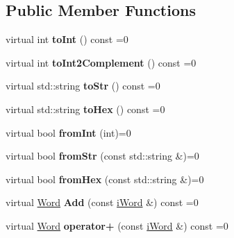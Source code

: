 \subsection*{Public Member Functions}
\begin{DoxyCompactItemize}
\item 
\hypertarget{classiWord_a3349d0a243d3432bb35b76af8420b1d9}{
virtual int {\bfseries toInt} () const =0}
\label{classiWord_a3349d0a243d3432bb35b76af8420b1d9}

\item 
\hypertarget{classiWord_a1377d01257b792c748b013be60b089e6}{
virtual int {\bfseries toInt2Complement} () const =0}
\label{classiWord_a1377d01257b792c748b013be60b089e6}

\item 
\hypertarget{classiWord_a0114861c4b660286834ad637f11dc4f4}{
virtual std::string {\bfseries toStr} () const =0}
\label{classiWord_a0114861c4b660286834ad637f11dc4f4}

\item 
\hypertarget{classiWord_a7fc28d0251f8acb4dc3f388fc25c57d1}{
virtual std::string {\bfseries toHex} () const =0}
\label{classiWord_a7fc28d0251f8acb4dc3f388fc25c57d1}

\item 
\hypertarget{classiWord_a6421bf139c6eb4044446997606cb65e7}{
virtual bool {\bfseries fromInt} (int)=0}
\label{classiWord_a6421bf139c6eb4044446997606cb65e7}

\item 
\hypertarget{classiWord_ad8df9e06ccb87d1e65766120713ef545}{
virtual bool {\bfseries fromStr} (const std::string \&)=0}
\label{classiWord_ad8df9e06ccb87d1e65766120713ef545}

\item 
\hypertarget{classiWord_a0c08832b3e9b41073fc6666407ef8c53}{
virtual bool {\bfseries fromHex} (const std::string \&)=0}
\label{classiWord_a0c08832b3e9b41073fc6666407ef8c53}

\item 
\hypertarget{classiWord_a999c52ac2e7abf756eeb16fe5b31aad7}{
virtual \hyperlink{classWord}{Word} {\bfseries Add} (const \hyperlink{classiWord}{iWord} \&) const =0}
\label{classiWord_a999c52ac2e7abf756eeb16fe5b31aad7}

\item 
\hypertarget{classiWord_a8dfb66b7cd91fe0a4169f071c1f9bc53}{
virtual \hyperlink{classWord}{Word} {\bfseries operator+} (const \hyperlink{classiWord}{iWord} \&) const =0}
\label{classiWord_a8dfb66b7cd91fe0a4169f071c1f9bc53}


\end{DoxyCompactItemize}
